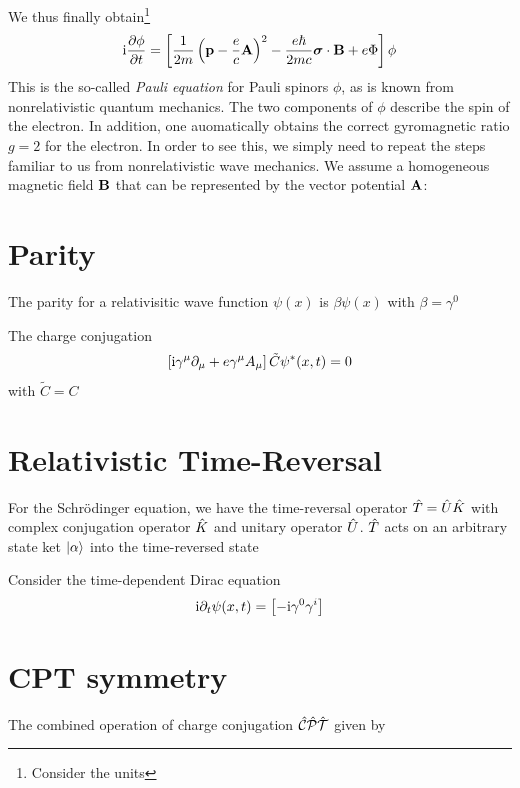We thus finally obtain\footnote{Consider the units}
\begin{align}
    \mathrm{i} \frac{\partial \phi}{\partial t} = \left[ \frac{1}{2m} \left(\mathbf{p} - \frac{e}{c} \mathbf{A}\right)^2 - \frac{e \hbar}{2mc} \boldsymbol{\sigma} \cdot \mathbf{B} + e \Phi \right] \phi
\end{align}
This is the so-called \emph{Pauli equation} for Pauli spinors $\phi$, as is known from nonrelativistic quantum mechanics. The two components of $\phi$ describe the spin of the electron. In addition, one auomatically obtains the correct gyromagnetic ratio $g=2$ for the electron. In order to see this, we simply need to repeat the steps familiar to us from nonrelativistic wave mechanics. We assume a homogeneous magnetic field $\mathbf{B}$ that can be represented by the vector potential $\mathbf{A}$: 



\section{Parity}

The parity for a relativisitic wave function $\psi(x)$ is $\beta \psi(x)$ with $\beta = \gamma^0$

The charge conjugation 
\begin{align}
    \left[ \mathrm{i} \gamma^ \mu \partial_ \mu + e \gamma^ \mu A_ \mu \right] \tilde{C} \psi^*(x,t) =0
\end{align}
with $\tilde{C} = C $


\section{Relativistic Time-Reversal}
For the Schrödinger equation, we have the time-reversal operator $\hat{T} = \hat{U} \hat{K}$ with complex conjugation operator $\hat{K}$ and unitary operator $\hat{U}$. $\hat{T}$ acts on an arbitrary state ket $\ket{\alpha}$ into the time-reversed state 


Consider the time-dependent Dirac equation 
\begin{align*}
    \mathrm{i} \partial_t \psi(x,t) = \left[ - \mathrm{i} \gamma^0 \gamma^i  \right]
\end{align*}
\section{CPT symmetry}
The combined operation of charge conjugation $\hat{\mathcal{C}} \hat{\mathcal{P}} \hat{\mathcal{T}}$ given by 





































